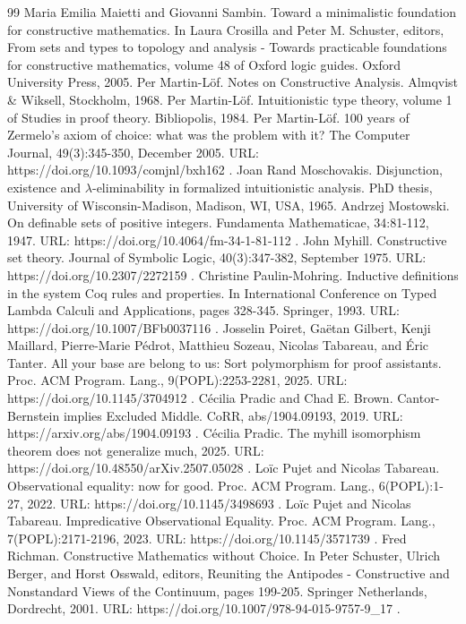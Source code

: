 \begin{thebibliography}{99}
 Maria Emilia Maietti and Giovanni Sambin. Toward a minimalistic foundation for constructive mathematics. In Laura Crosilla and Peter M. Schuster, editors, From sets and types to topology and analysis - Towards practicable foundations for constructive mathematics, volume 48 of Oxford logic guides. Oxford University Press, 2005.
 Per Martin-Löf. Notes on Constructive Analysis. Almqvist \& Wiksell, Stockholm, 1968.
 Per Martin-Löf. Intuitionistic type theory, volume 1 of Studies in proof theory. Bibliopolis, 1984.
 Per Martin-Löf. 100 years of Zermelo’s axiom of choice: what was the problem with it? The Computer Journal, 49(3):345-350, December 2005. URL: https://doi.org/10.1093/comjnl/bxh162 .
 Joan Rand Moschovakis. Disjunction, existence and \ensuremath{\lambda}-eliminability in formalized intuitionistic analysis. PhD thesis, University of Wisconsin-Madison, Madison, WI, USA, 1965.
 Andrzej Mostowski. On definable sets of positive integers. Fundamenta Mathematicae, 34:81-112, 1947. URL: https://doi.org/10.4064/fm-34-1-81-112 .
 John Myhill. Constructive set theory. Journal of Symbolic Logic, 40(3):347-382, September 1975. URL: https://doi.org/10.2307/2272159 .
 Christine Paulin-Mohring. Inductive definitions in the system Coq rules and properties. In International Conference on Typed Lambda Calculi and Applications, pages 328-345. Springer, 1993. URL: https://doi.org/10.1007/BFb0037116 .
 Josselin Poiret, Gaëtan Gilbert, Kenji Maillard, Pierre-Marie Pédrot, Matthieu Sozeau, Nicolas Tabareau, and Éric Tanter. All your base are belong to us: Sort polymorphism for proof assistants. Proc. ACM Program. Lang., 9(POPL):2253-2281, 2025. URL: https://doi.org/10.1145/3704912 .
 Cécilia Pradic and Chad E. Brown. Cantor-Bernstein implies Excluded Middle. CoRR, abs/1904.09193, 2019. URL: https://arxiv.org/abs/1904.09193 .
 Cécilia Pradic. The myhill isomorphism theorem does not generalize much, 2025. URL: https://doi.org/10.48550/arXiv.2507.05028 .
 Loïc Pujet and Nicolas Tabareau. Observational equality: now for good. Proc. ACM Program. Lang., 6(POPL):1-27, 2022. URL: https://doi.org/10.1145/3498693 .
 Loïc Pujet and Nicolas Tabareau. Impredicative Observational Equality. Proc. ACM Program. Lang., 7(POPL):2171-2196, 2023. URL: https://doi.org/10.1145/3571739 .
 Fred Richman. Constructive Mathematics without Choice. In Peter Schuster, Ulrich Berger, and Horst Osswald, editors, Reuniting the Antipodes - Constructive and Nonstandard Views of the Continuum, pages 199-205. Springer Netherlands, Dordrecht, 2001. URL: https://doi.org/10.1007/978-94-015-9757-9\_17 .

\end{thebibliography}

